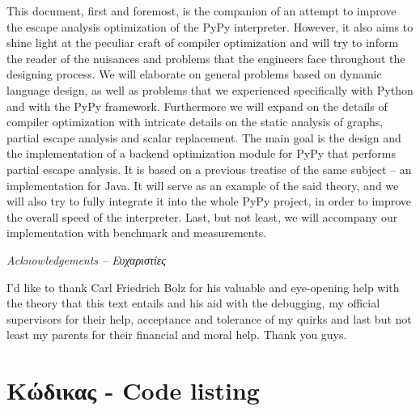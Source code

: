 \documentclass[12pt, english, singlespacing, parskip, headsepline]{MastersDoctoralThesis}
\begin{document}
This document, first and foremost, is the companion of an attempt to improve the
escape analysis optimization of the PyPy interpreter. However, it also aims to
shine light at the peculiar craft of compiler optimization and will try to
inform the reader of the nuisances and problems that the engineers face
throughout the designing process. We will elaborate on general problems based on
dynamic language design, as well as problems that we experienced specifically
with Python and with the PyPy framework. Furthermore we will expand on the
details of compiler optimization with intricate details on the static analysis
of graphs, partial escape analysis and scalar replacement. The main goal is the
design and the implementation of a backend optimization module for PyPy that
performs partial escape analysis. It is based on a previous treatise of the same
subject – an implementation for Java. It will serve as an example of the said
theory, and we will also try to fully integrate it into the whole PyPy project,
in order to improve the overall speed of the interpreter. Last, but not least,
we will accompany our implementation with benchmark and measurements.


\newpage\null\thispagestyle{empty}\newpage
\thispagestyle{plain}
\begin{center}{\huge\textit{Acknowledgements – Ευχαριστίες}\par}\end{center}
\vspace{3cm}

I'd like to thank Carl Friedrich Bolz for his valuable and eye-opening help with
the theory that this text entails and his aid with the debugging, my official
supervisors for their help, acceptance and tolerance of my quirks and last but not
least my parents for their financial and moral help. Thank you guys.


\tableofcontents


\mainmatter %

\pagestyle{thesis}










\appendix 
\chapter{Κώδικας - Code listing}


\printbibliography
\end{document}
